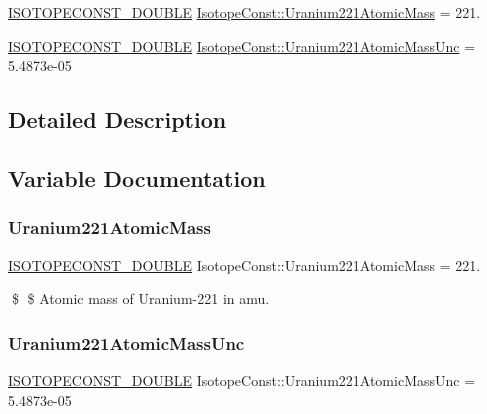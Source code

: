 \begin{DoxyCompactItemize}
\item 
\mbox{\hyperlink{group___isotope_const-_macros_ga8f45a7272ce02c0b4c65c44636ed719a}{I\+S\+O\+T\+O\+P\+E\+C\+O\+N\+S\+T\+\_\+\+D\+O\+U\+B\+LE}} \mbox{\hyperlink{group___isotope_const-_uranium-_u221_ga6966ece1aa47b9de72f32726aa1760f6}{Isotope\+Const\+::\+Uranium221\+Atomic\+Mass}} = 221.
\item 
\mbox{\hyperlink{group___isotope_const-_macros_ga8f45a7272ce02c0b4c65c44636ed719a}{I\+S\+O\+T\+O\+P\+E\+C\+O\+N\+S\+T\+\_\+\+D\+O\+U\+B\+LE}} \mbox{\hyperlink{group___isotope_const-_uranium-_u221_gafad22fa54e8b5a6fa3333ceed5c39d44}{Isotope\+Const\+::\+Uranium221\+Atomic\+Mass\+Unc}} = 5.\+4873e-\/05
\end{DoxyCompactItemize}


\subsection{Detailed Description}


\subsection{Variable Documentation}
\mbox{\label{group___isotope_const-_uranium-_u221_ga6966ece1aa47b9de72f32726aa1760f6}} 
\subsubsection{\texorpdfstring{Uranium221\+Atomic\+Mass}{Uranium221AtomicMass}}
{\footnotesize\ttfamily \mbox{\hyperlink{group___isotope_const-_macros_ga8f45a7272ce02c0b4c65c44636ed719a}{I\+S\+O\+T\+O\+P\+E\+C\+O\+N\+S\+T\+\_\+\+D\+O\+U\+B\+LE}} Isotope\+Const\+::\+Uranium221\+Atomic\+Mass = 221.}

\$ \$ Atomic mass of Uranium-\/221 in amu. \mbox{\label{group___isotope_const-_uranium-_u221_gafad22fa54e8b5a6fa3333ceed5c39d44}} 
\subsubsection{\texorpdfstring{Uranium221\+Atomic\+Mass\+Unc}{Uranium221AtomicMassUnc}}
{\footnotesize\ttfamily \mbox{\hyperlink{group___isotope_const-_macros_ga8f45a7272ce02c0b4c65c44636ed719a}{I\+S\+O\+T\+O\+P\+E\+C\+O\+N\+S\+T\+\_\+\+D\+O\+U\+B\+LE}} Isotope\+Const\+::\+Uranium221\+Atomic\+Mass\+Unc = 5.\+4873e-\/05}

